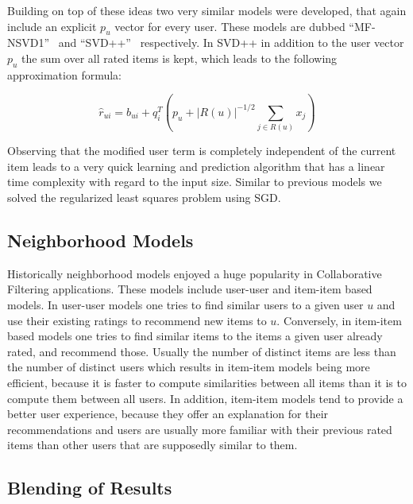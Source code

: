 \documentclass[10pt,conference,compsocconf]{IEEEtran}
\newcommand{\abs}[1]{\left\lvert#1\right\rvert}
\begin{document}
Building on top of these ideas two very similar models were developed, that
again include an explicit $p_u$ vector for every user. These models are dubbed
``MF-NSVD1''~\cite{takacs2008unified} and
``SVD++''~\cite{koren2008factorization, koren2011advances} respectively. In
SVD++ in addition to the user vector $p_u$ the sum over all rated items is kept,
which leads to the following approximation formula:

\begin{equation}
  \hat{r}_{ui} = b_{ui} + q_i^T \left( p_u + \abs{R(u)}^{-1/2} \sum_{j \in
      R(u)} x_j \right )
\end{equation}

Observing that the modified user term is completely independent of the current
item leads to a very quick learning and prediction algorithm that has a linear
time complexity with regard to the input size. Similar to previous models we
solved the regularized least squares problem using SGD.\@

\subsection{Neighborhood Models}
\label{sub:neighborhood_models}

Historically neighborhood models enjoyed a huge popularity in Collaborative
Filtering applications. These models include user-user and item-item based
models. In user-user models one tries to find similar users to a given user $u$
and use their existing ratings to recommend new items to $u$. Conversely, in
item-item based models one tries to find similar items to the items a given
user already rated, and recommend those. Usually the number of distinct items
are less than the number of distinct users which results in item-item models
being more efficient, because it is faster to compute similarities between all
items than it is to compute them between all users. In addition, item-item
models tend to provide a better user experience, because they offer an
explanation for their recommendations and users are usually more familiar with
their previous rated items than other users that are supposedly similar to them.





\subsection{Blending of Results}
\label{sub:blending_of_results}
\end{document}
